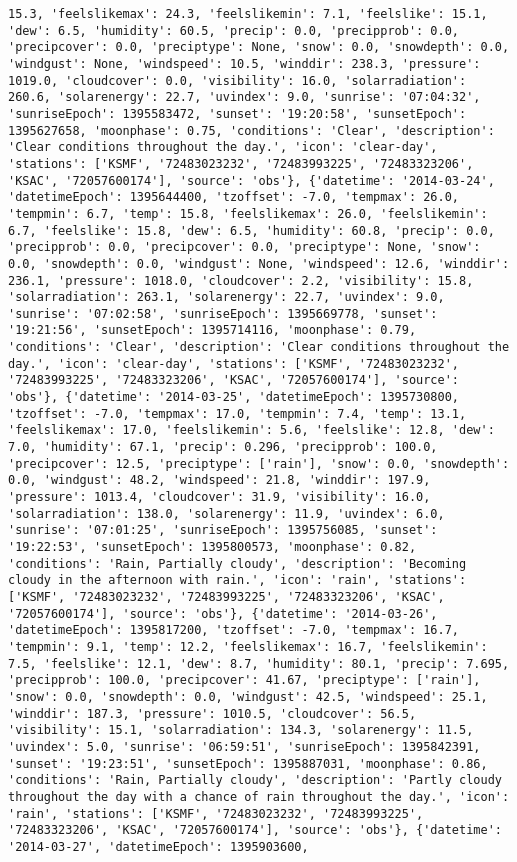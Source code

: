 \documentclass[
  letterpaper,
  DIV=11,
  numbers=noendperiod]{scrartcl}
\begin{document}
\begin{verbatim}
15.3, 'feelslikemax': 24.3, 'feelslikemin': 7.1, 'feelslike': 15.1, 'dew': 6.5, 'humidity': 60.5, 'precip': 0.0, 'precipprob': 0.0, 'precipcover': 0.0, 'preciptype': None, 'snow': 0.0, 'snowdepth': 0.0, 'windgust': None, 'windspeed': 10.5, 'winddir': 238.3, 'pressure': 1019.0, 'cloudcover': 0.0, 'visibility': 16.0, 'solarradiation': 260.6, 'solarenergy': 22.7, 'uvindex': 9.0, 'sunrise': '07:04:32', 'sunriseEpoch': 1395583472, 'sunset': '19:20:58', 'sunsetEpoch': 1395627658, 'moonphase': 0.75, 'conditions': 'Clear', 'description': 'Clear conditions throughout the day.', 'icon': 'clear-day', 'stations': ['KSMF', '72483023232', '72483993225', '72483323206', 'KSAC', '72057600174'], 'source': 'obs'}, {'datetime': '2014-03-24', 'datetimeEpoch': 1395644400, 'tzoffset': -7.0, 'tempmax': 26.0, 'tempmin': 6.7, 'temp': 15.8, 'feelslikemax': 26.0, 'feelslikemin': 6.7, 'feelslike': 15.8, 'dew': 6.5, 'humidity': 60.8, 'precip': 0.0, 'precipprob': 0.0, 'precipcover': 0.0, 'preciptype': None, 'snow': 0.0, 'snowdepth': 0.0, 'windgust': None, 'windspeed': 12.6, 'winddir': 236.1, 'pressure': 1018.0, 'cloudcover': 2.2, 'visibility': 15.8, 'solarradiation': 263.1, 'solarenergy': 22.7, 'uvindex': 9.0, 'sunrise': '07:02:58', 'sunriseEpoch': 1395669778, 'sunset': '19:21:56', 'sunsetEpoch': 1395714116, 'moonphase': 0.79, 'conditions': 'Clear', 'description': 'Clear conditions throughout the day.', 'icon': 'clear-day', 'stations': ['KSMF', '72483023232', '72483993225', '72483323206', 'KSAC', '72057600174'], 'source': 'obs'}, {'datetime': '2014-03-25', 'datetimeEpoch': 1395730800, 'tzoffset': -7.0, 'tempmax': 17.0, 'tempmin': 7.4, 'temp': 13.1, 'feelslikemax': 17.0, 'feelslikemin': 5.6, 'feelslike': 12.8, 'dew': 7.0, 'humidity': 67.1, 'precip': 0.296, 'precipprob': 100.0, 'precipcover': 12.5, 'preciptype': ['rain'], 'snow': 0.0, 'snowdepth': 0.0, 'windgust': 48.2, 'windspeed': 21.8, 'winddir': 197.9, 'pressure': 1013.4, 'cloudcover': 31.9, 'visibility': 16.0, 'solarradiation': 138.0, 'solarenergy': 11.9, 'uvindex': 6.0, 'sunrise': '07:01:25', 'sunriseEpoch': 1395756085, 'sunset': '19:22:53', 'sunsetEpoch': 1395800573, 'moonphase': 0.82, 'conditions': 'Rain, Partially cloudy', 'description': 'Becoming cloudy in the afternoon with rain.', 'icon': 'rain', 'stations': ['KSMF', '72483023232', '72483993225', '72483323206', 'KSAC', '72057600174'], 'source': 'obs'}, {'datetime': '2014-03-26', 'datetimeEpoch': 1395817200, 'tzoffset': -7.0, 'tempmax': 16.7, 'tempmin': 9.1, 'temp': 12.2, 'feelslikemax': 16.7, 'feelslikemin': 7.5, 'feelslike': 12.1, 'dew': 8.7, 'humidity': 80.1, 'precip': 7.695, 'precipprob': 100.0, 'precipcover': 41.67, 'preciptype': ['rain'], 'snow': 0.0, 'snowdepth': 0.0, 'windgust': 42.5, 'windspeed': 25.1, 'winddir': 187.3, 'pressure': 1010.5, 'cloudcover': 56.5, 'visibility': 15.1, 'solarradiation': 134.3, 'solarenergy': 11.5, 'uvindex': 5.0, 'sunrise': '06:59:51', 'sunriseEpoch': 1395842391, 'sunset': '19:23:51', 'sunsetEpoch': 1395887031, 'moonphase': 0.86, 'conditions': 'Rain, Partially cloudy', 'description': 'Partly cloudy throughout the day with a chance of rain throughout the day.', 'icon': 'rain', 'stations': ['KSMF', '72483023232', '72483993225', '72483323206', 'KSAC', '72057600174'], 'source': 'obs'}, {'datetime': '2014-03-27', 'datetimeEpoch': 1395903600, 
\end{verbatim}
\end{document}
